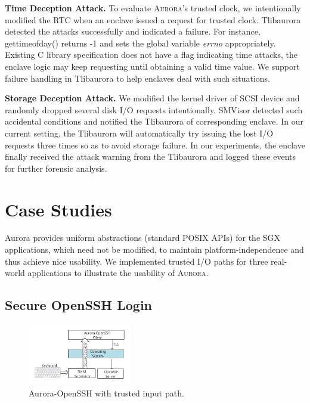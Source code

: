 \textbf{Time Deception Attack.}
To evaluate \textsc{Aurora}’s trusted clock, we intentionally modified the RTC when an enclave issued a request for trusted clock. Tlibaurora detected the attacks successfully and indicated a failure. For instance, \textsf{gettimeofday()} returns -1 and sets the global variable \textit{errno} appropriately. Existing C library specification does not have a flag indicating time attacks, the enclave logic may keep requesting until obtaining a valid time value. We support failure handling in Tlibaurora to help enclaves deal with such situations.

\textbf{Storage Deception Attack.}
We modified the kernel driver of SCSI device and randomly dropped several disk I/O requests intentionally.  SMVisor detected such accidental conditions and notified the Tlibaurora of corresponding enclave. In our current setting, the Tlibaurora will automatically try issuing the lost I/O requests three times so as to avoid storage failure. In our experiments, the enclave finally received the attack warning from the Tlibaurora and logged these events for further forensic analysis.


\section{Case Studies}\label{casestudy}
Aurora provides uniform abstractions (standard POSIX APIs) for the SGX applications, which need not be modified, to maintain platform-independence and thus achieve nice usability. We implemented trusted I/O paths for three real-world applications to illustrate the usability of \textsc{Aurora}.

\subsection{Secure OpenSSH Login}\label{openssh}

\begin{figure}[t]
	\centering
	\includegraphics[width=0.4\textwidth]{figures/ssh.pdf} %
	\caption{Aurora-OpenSSH with trusted input path.}
	\label{fig:openssh}
\end{figure}

